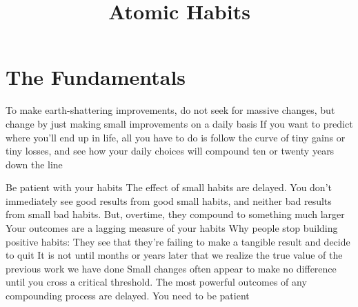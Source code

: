 \documentclass[10pt,twocolumn]{../notes}
\title{Atomic Habits}
\begin{document}
\maketitle
\tableofcontents
\section{The Fundamentals}
\Advice To make earth-shattering improvements, do not seek for massive changes, but change by just making small improvements on a daily basis
\Quote If you want to predict where you’ll end up in life, all you have to do is follow the curve of tiny gains or tiny losses, and see how your daily choices will compound ten or twenty years down the line

\Advice Be patient with your habits
\Fact The effect of small habits are delayed. You don’t immediately see good results from good small habits, and neither bad results from small bad habits. But, overtime, they compound to something much larger
\Quote Your outcomes are a lagging measure of your habits
\Fact Why people stop building positive habits: They see that they’re failing to make a tangible result and decide to quit
\Quote It is not until months or years later that we realize the true value of the previous work we have done
\Quote Small changes often appear to make no difference until you cross a critical threshold. The most powerful outcomes of any compounding process are delayed. You need to be patient
\end{document}
